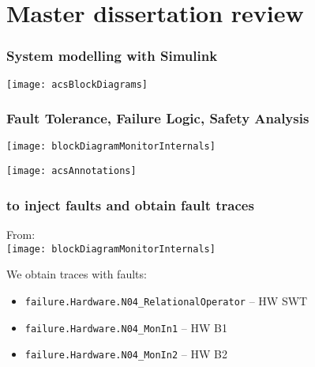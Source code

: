 \section{Master dissertation review}

\begin{frame}
\frametitle{System modelling with Simulink}
\texttt{[image: acsBlockDiagrams]}
\end{frame}

\begin{frame}
\frametitle{Fault Tolerance, Failure Logic, Safety Analysis}
\texttt{[image: blockDiagramMonitorInternals]}\par
\texttt{[image: acsAnnotations]}
\end{frame}

\begin{frame}[fragile]
\frametitle{\CSPM to inject faults and obtain fault traces}
From:\\
\texttt{[image: blockDiagramMonitorInternals]}\par

We obtain traces with faults:
{\tiny
\begin{itemize}
  \item \verb|failure.Hardware.N04_RelationalOperator| -- HW SWT 
  \item \verb|failure.Hardware.N04_MonIn1| -- HW B1 
  \item \verb|failure.Hardware.N04_MonIn2| -- HW B2 
\end{itemize}
}

\end{frame}

